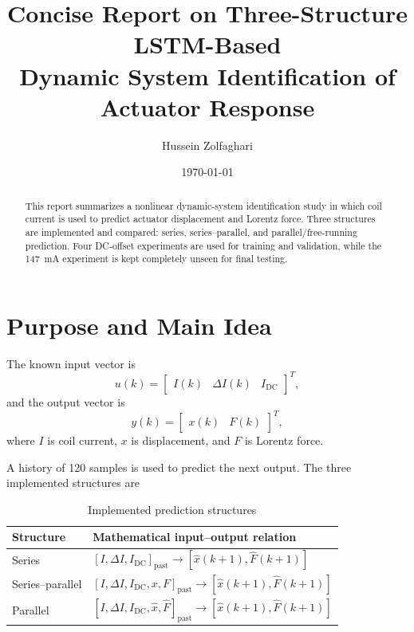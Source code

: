 \documentclass[11pt]{article}
\title{
Concise Report on Three-Structure LSTM-Based\\
Dynamic System Identification of Actuator Response
}
\author{Hussein Zolfaghari}
\date{\today}
\begin{document}
\maketitle

\begin{abstract}
This report summarizes a nonlinear dynamic-system identification study in
which coil current is used to predict actuator displacement and Lorentz force.
Three structures are implemented and compared: series, series--parallel, and
parallel/free-running prediction. Four DC-offset experiments are used for
training and validation, while the 147~mA experiment is kept completely unseen
for final testing.
\end{abstract}

\section{Purpose and Main Idea}

The known input vector is
\[
u(k)=
\begin{bmatrix}
I(k) & \Delta I(k) & I_{\mathrm{DC}}
\end{bmatrix}^{T},
\]
and the output vector is
\[
y(k)=
\begin{bmatrix}
x(k) & F(k)
\end{bmatrix}^{T},
\]
where $I$ is coil current, $x$ is displacement, and $F$ is Lorentz force.

A history of 120 samples is used to predict the next output. The three
implemented structures are

\begin{table}[H]
\centering
\caption{Implemented prediction structures}
\begin{tabularx}{\textwidth}{lX}
\toprule
Structure & Mathematical input--output relation \\
\midrule
Series &
$[I,\Delta I,I_{\mathrm{DC}}]_{\mathrm{past}}
\rightarrow[\hat{x}(k+1),\hat{F}(k+1)]$ \\[1mm]

Series--parallel &
$[I,\Delta I,I_{\mathrm{DC}},x,F]_{\mathrm{past}}
\rightarrow[\hat{x}(k+1),\hat{F}(k+1)]$ \\[1mm]

Parallel &
$[I,\Delta I,I_{\mathrm{DC}},\hat{x},\hat{F}]_{\mathrm{past}}
\rightarrow[\hat{x}(k+1),\hat{F}(k+1)]$ \\
\bottomrule
\end{tabularx}
\end{table}
\end{document}
